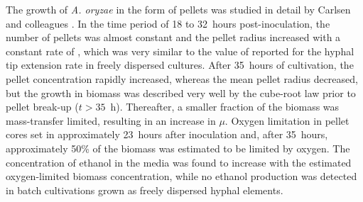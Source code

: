 The growth of \emph{A. oryzae} in the form of pellets was studied in detail by Carlsen and colleagues \cite{carlsen1996a}. In the time period of 18 to 32~hours post-inoculation, the number of pellets was almost constant and the pellet radius increased with a constant rate of , which was very similar to the value of  reported for the hyphal tip extension rate in freely dispersed cultures. After 35~hours of cultivation, the pellet concentration rapidly increased, whereas the mean pellet radius decreased, but the growth in biomass was described very well by the cube-root law prior to pellet break-up ($t > 35$~h). Thereafter, a smaller fraction of the biomass was mass-transfer limited, resulting in an increase in $\mu$. Oxygen limitation in pellet cores set in approximately 23~hours after inoculation and, after 35~hours, approximately 50\% of the biomass was estimated to be limited by oxygen. The concentration of ethanol in the media was found to increase with the estimated oxygen-limited biomass concentration, while no ethanol production was detected in batch cultivations grown as freely dispersed hyphal elements.
